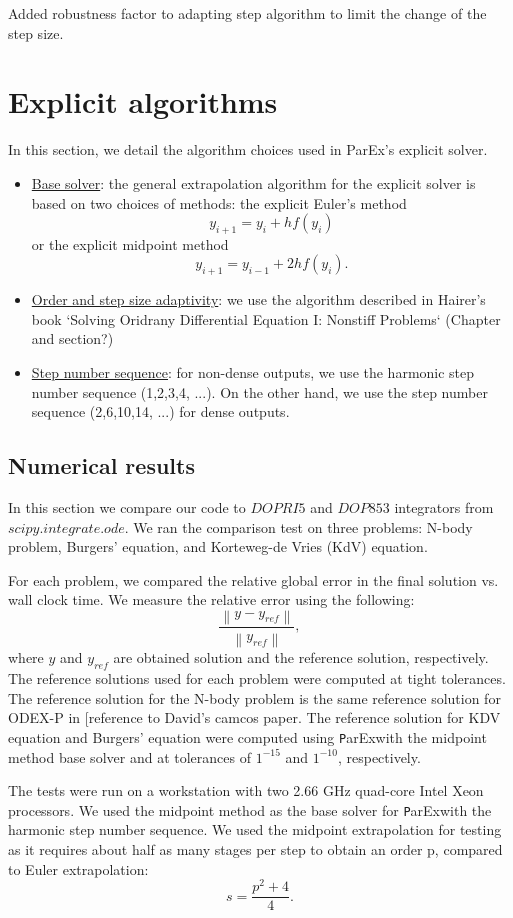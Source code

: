 \documentclass[12pt]{article}
\newcommand{\parex}{\texttt ParEx}
\newcommand\norm[1]{\left\lVert#1\right\rVert}
\begin{document}
Added robustness factor to adapting step algorithm to limit the change of the step size.

\section{Explicit algorithms}
In this section, we detail the algorithm choices used in ParEx's explicit solver.
\begin{itemize}
	\item \underline{Base solver}:
    the general extrapolation algorithm for the explicit solver is based on two choices of methods: 
    the explicit Euler's method 
    	$$y_{i+1}=y_{i}+hf(y_{i})$$    
    or the explicit midpoint method
    	$$y_{i+1}=y_{i-1}+2hf(y_{i}).$$
    \item \underline{Order and step size adaptivity}: we use the algorithm described in Hairer's book `Solving Oridrany Differential Equation I: Nonstiff Problems` (Chapter and section?)
    \item \underline{Step number sequence}:    
    for non-dense outputs, we use the harmonic step number sequence (1,2,3,4, ...). On the other hand, we use the step number sequence (2,6,10,14, ...) for dense outputs.
\end{itemize}
\subsection{Numerical results}
In this section we compare our code to $DOPRI5$ and $DOP853$ integrators from $scipy.integrate.ode$. We ran the comparison test on three problems: N-body problem, Burgers' equation, and Korteweg-de Vries (KdV) equation. 

For each problem, we compared the relative global error in the final solution vs. wall clock time. We measure the relative error using the following: $$\frac{\norm{y - y_{ref}}}{\norm{y_{ref}}},$$ where $y$ and $y_{ref}$ are obtained solution and the reference solution, respectively. The reference solutions used for each problem were computed at tight tolerances. The reference solution for the N-body problem is the same reference solution for ODEX-P in [reference to David's camcos paper. The reference solution for KDV equation and Burgers' equation were computed using \parex with the midpoint method base solver and at tolerances of $1^{-15}$ and  $1^{-10}$, respectively.

The tests were run on a workstation with two 2.66 GHz quad-core Intel Xeon processors. We used the midpoint method as the base solver for \parex with the harmonic step number sequence. We used the midpoint extrapolation for testing as it requires about half as many stages per step to obtain an order p, compared to Euler extrapolation: $$ s = \frac{p^2 + 4}{4}.$$ 
\end{document}
